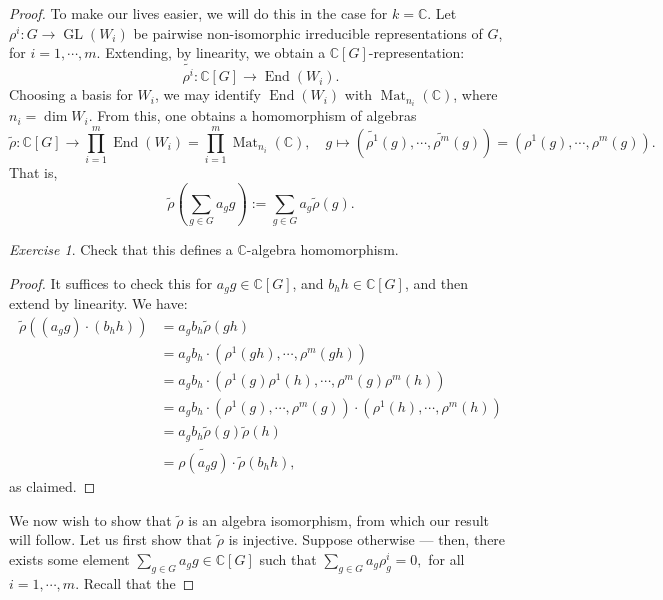 \documentclass[a4paper]{report}
\theoremstyle{definition}
\theoremstyle{remark}
\theoremstyle{proposition}
\theoremstyle{conjecture}
\theoremstyle{lemma}
\theoremstyle{corollary}
\theoremstyle{exercise}
\newtheorem{exercise}{Exercise}
\theoremstyle{example}
\newcommand{\C}{\mathbb{C}}
\newcommand{\on}{\operatorname}
\begin{document}
\begin{proof}
    To make our lives easier, we will do this in the case for $k=\C$.
    Let $\rho^i : G \to \on{GL}(W_i)$ be pairwise non-isomorphic irreducible
    representations of $G$, for $i=1,\cdots,m$. Extending, by linearity,
    we obtain a $\C[G]$-representation:
    $$\widetilde{\rho^i} : \C[G] \longrightarrow \on{End}(W_i).$$
    Choosing a basis for $W_i$, we may identify 
    $\on{End}(W_i)$ with $\on{Mat}_{n_i}(\C)$, where $n_i = \dim W_i$.
    From this, one obtains a homomorphism of algebras 
    $$\widetilde{\rho} : \C[G] \longrightarrow \prod_{i=1}^m \on{End}(W_i) = \prod_{i=1}^m \on{Mat}_{n_i}(\C), \quad g\longmapsto (\widetilde{\rho^1}(g),\cdots,\widetilde{\rho^m}(g)) = (\rho^1(g),\cdots,\rho^m(g)).$$
    That is, 
    $$\widetilde{\rho}\left(\sum_{g\in G} a_gg\right) := \sum_{g \in G}a_g\widetilde{\rho}(g).$$
    \begin{exercise}
        Check that this defines a $\C$-algebra homomorphism.
    \end{exercise}
    \begin{proof}
        It suffices to check this for $a_gg \in \C[G]$, and 
        $b_hh \in \C[G]$, and then extend by linearity.
        We have:
        \begin{align*}
            \widetilde{\rho}( (a_gg)\cdot (b_hh)) &= a_gb_h\widetilde{\rho}(gh)\\
                                                  &= a_gb_h\cdot (\rho^1(gh),\cdots,\rho^m(gh))\\
                                                  &= a_gb_h \cdot (\rho^1(g)\rho^1(h),\cdots,\rho^m(g)\rho^m(h))\\
                                                  &= a_gb_h\cdot (\rho^1(g),\cdots,\rho^m(g))\cdot (\rho^1(h),\cdots,\rho^m(h))\\
                                                  &= a_gb_h\widetilde{\rho}(g)\widetilde{\rho}(h)\\
                                                  &= \widetilde{\rho(a_gg)}\cdot\widetilde{\rho}(b_hh),
        \end{align*}
        as claimed.
    \end{proof}
    We now wish to show that $\widetilde{\rho}$ is an algebra isomorphism,
    from which our result will follow.
    Let us first show that $\widetilde{\rho}$ is injective. Suppose 
    otherwise --- then, there exists some element 
    $\sum_{g\in G}a_gg \in\C[G]$ such that $\sum_{g \in G} a_g\rho_g^i = 0,$
    for all $i =1,\cdots,m$. Recall that the 

\end{proof}
\end{document}
